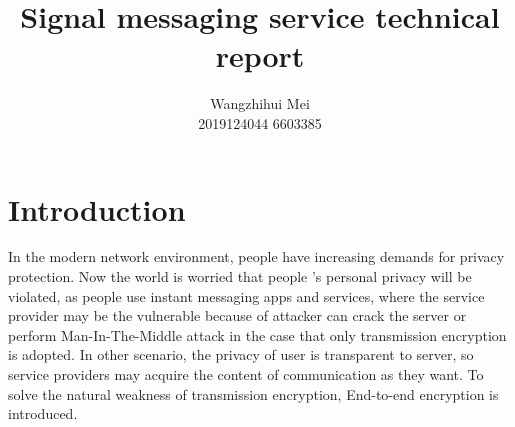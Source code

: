 \documentclass[11pt,en]{elegantpaper}
\title{Signal messaging service technical report}
\author{Wangzhihui Mei \\ 2019124044 6603385}
\institute{CCNU-UOW JI}
\date{}
\begin{document}
\maketitle

\begin{abstract}




\end{abstract}



\section{Introduction}
In the modern network environment, people have increasing demands for privacy protection. Now the world is worried that people ’s personal privacy will be violated, as people use instant messaging apps and services, where the service provider may be the vulnerable because of attacker can crack the server or perform Man-In-The-Middle attack in the case that only transmission encryption is adopted. In other scenario, the privacy of user is transparent to server, so service providers may acquire the content of communication as they want. To solve the natural weakness of transmission encryption, End-to-end encryption is introduced.
\end{document}

